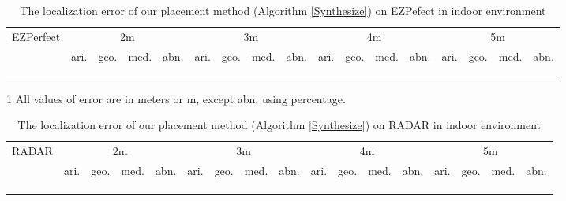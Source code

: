 \documentclass[10pt, conference, letterpaper]{IEEEtran}
\begin{document}
\begin{table*}[!t]
\renewcommand{\arraystretch}{1.0}
\caption{The localization error of our placement method (Algorithm \ref{Synthesize}) on EZPefect in indoor environment} \label{experiment_error_EZPefect}
\centering
\begin{threeparttable}
\begin{tabular}{|c|p{0.5cm}|p{0.5cm}|p{0.5cm}|p{0.6cm}|p{0.5cm}|p{0.5cm}|p{0.5cm}|p{0.6cm}|p{0.5cm}|p{0.5cm}|p{0.5cm}|p{0.6cm}|p{0.5cm}|p{0.5cm}|p{0.5cm}|p{0.6cm}|}
  \hline
\multirow{2}{*}{EZPerfect} & \multicolumn{4}{c|}{2m} & \multicolumn{4}{c|}{3m} & \multicolumn{4}{c|}{4m} & \multicolumn{4}{c|}{5m} \\
  \cline{2-17} & ari. & geo. & med. & abn. & ari. & geo. & med. & abn. & ari. & geo. & med. & abn. & ari. & geo. & med. & abn. \\
  \hline
   &  &  &  &  &  &  &  &  &  &  &  &  &  &  &  &  \\
  \hline
   &  &  &  &  &  &  &  &  &  &  &  &  &  &  &  &  \\
  \hline
   &  &  &  &  &  &  &  &  &  &  &  &  &  &  &  &  \\
  \hline
\end{tabular}
\begin{tablenotes}
    \footnotesize
    \item[1] All values of error are in meters or m, except abn. using percentage.
\end{tablenotes}
\end{threeparttable}
\end{table*}

\begin{table*}[!t]
\renewcommand{\arraystretch}{1.0}
\caption{The localization error of our placement method (Algorithm \ref{Synthesize}) on RADAR in indoor environment} \label{experiment_error_RADAR}
\centering
\begin{tabular}{|c|p{0.5cm}|p{0.5cm}|p{0.5cm}|p{0.6cm}|p{0.5cm}|p{0.5cm}|p{0.5cm}|p{0.6cm}|p{0.5cm}|p{0.5cm}|p{0.5cm}|p{0.6cm}|p{0.5cm}|p{0.5cm}|p{0.5cm}|p{0.6cm}|}
  \hline
\multirow{2}{*}{RADAR} & \multicolumn{4}{c|}{2m} & \multicolumn{4}{c|}{3m} & \multicolumn{4}{c|}{4m} & \multicolumn{4}{c|}{5m} \\
  \cline{2-17} & ari. & geo. & med. & abn. & ari. & geo. & med. & abn. & ari. & geo. & med. & abn. & ari. & geo. & med. & abn. \\
  \hline
   &  &  &  &  &  &  &  &  &  &  &  &  &  &  &  &  \\
  \hline
   &  &  &  &  &  &  &  &  &  &  &  &  &  &  &  &  \\
  \hline
   &  &  &  &  &  &  &  &  &  &  &  &  &  &  &  &  \\
  \hline
\end{tabular}
\end{table*}
\end{document}
